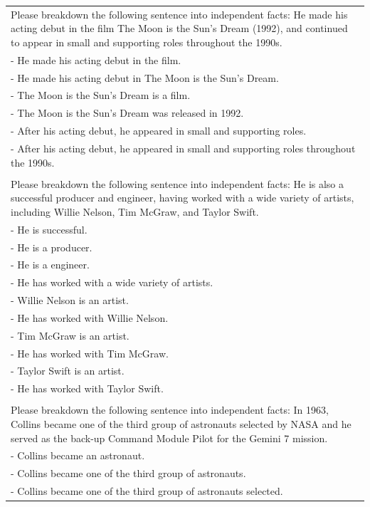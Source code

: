 \begin{table}[t]
    \scriptsize \centering
    \begin{tabular}{|p{}|}
        \toprule
Please breakdown the following sentence into independent facts: He made his acting debut in the film The Moon is the Sun's Dream (1992), and continued to appear in small and supporting roles throughout the 1990s. \\
- He made his acting debut in the film. \\
- He made his acting debut in The Moon is the Sun's Dream. \\
- The Moon is the Sun's Dream is a film. \\
- The Moon is the Sun's Dream was released in 1992.\\
- After his acting debut, he appeared in small and supporting roles.\\
- After his acting debut, he appeared in small and supporting roles throughout the 1990s.\\
\\
Please breakdown the following sentence into independent facts: He is also a successful producer and engineer, having worked with a wide variety of artists, including Willie Nelson, Tim McGraw, and Taylor Swift.\\
- He is successful.\\
- He is a producer.\\
- He is a engineer.\\
- He has worked with a wide variety of artists.\\
- Willie Nelson is an artist.\\
- He has worked with Willie Nelson.\\
- Tim McGraw is an artist.\\
- He has worked with Tim McGraw.\\
- Taylor Swift is an artist.\\
- He has worked with Taylor Swift.\\
\\
Please breakdown the following sentence into independent facts: In 1963, Collins became one of the third group of astronauts selected by NASA and he served as the back-up Command Module Pilot for the Gemini 7 mission.\\
- Collins became an astronaut.\\
- Collins became one of the third group of astronauts.\\
- Collins became one of the third group of astronauts selected.\\

\end{tabular}
\end{table}
